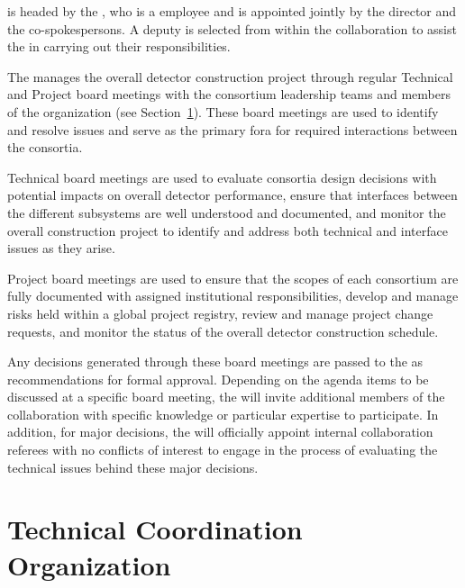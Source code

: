  is headed by the , who is a 
employee and is appointed jointly by the  director 
and the  co-spokespersons.  A deputy  
is selected from within the collaboration to assist the 
 in carrying out their responsibilities.

The  manages the overall detector construction 
project through regular Technical and Project board meetings with 
the consortium leadership teams and members of the  
organization (see Section~\ref{sec:tco}).  These board meetings 
are used to identify and resolve issues and serve as the primary 
fora for required interactions between the consortia.

Technical board meetings are used to evaluate consortia design
decisions with potential impacts on overall detector performance,
ensure that interfaces between the different subsystems are well
understood and documented, and monitor the overall construction
project to identify and address both technical and interface 
issues as they arise.

Project board meetings are used to ensure that the scopes of 
each consortium are fully documented with assigned institutional
responsibilities, develop and manage risks held within a global
project registry, review and manage project change requests, and
monitor the status of the overall detector construction schedule.

Any decisions generated through these board meetings are passed to 
the   as recommendations for formal approval.
Depending on the agenda items to be discussed at a specific board
meeting, the  will invite additional members of the
collaboration with specific knowledge or particular expertise to
participate.  In addition, for major decisions, the 
will officially appoint internal collaboration referees with no
conflicts of interest to engage in the process of evaluating the 
technical issues behind these major decisions.

\section{Technical Coordination Organization}
\label{sec:tco}

